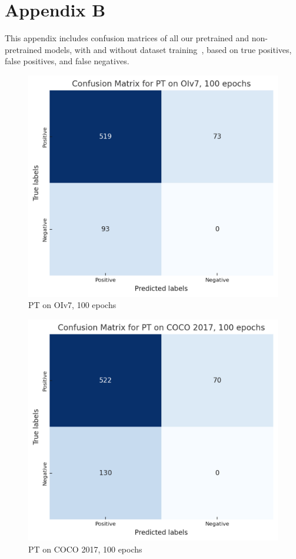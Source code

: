 \documentclass[10pt,twocolumn,letterpaper]{article}
\begin{document}
\section{Appendix B}
This appendix includes confusion matrices of all our pretrained and non-pretrained models, with and without dataset training~\cite{kornilov-dataset}, based on true positives, false positives, and false negatives.

\begin{figure}[H]
    \centering
    \includegraphics[width=0.8\linewidth]{cmptoiv7100.png}
    \caption{PT on OIv7, 100 epochs}
    \label{fig:cmptoiv7100}
\end{figure}

\begin{figure}[H]
    \centering
    \includegraphics[width=0.8\linewidth]{cmptcoco100.png}
    \caption{PT on COCO 2017, 100 epochs}
    \label{fig:cmptcoco100}
\end{figure}
\end{document}
